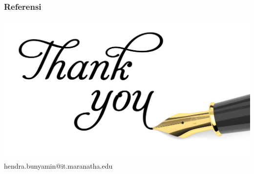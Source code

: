 \documentclass{beamer}
\theoremstyle{mystyle}
\begin{document}
%
\begin{frame}[allowframebreaks]
  \frametitle<presentation>{Referensi}
    {\footnotesize
    
    
    }    
\end{frame}



\begin{frame}[plain]
		\centering\includegraphics[scale=1]{images/thank-you}	
		hendra.bunyamin@it.maranatha.edu
\end{frame}
\end{document}

